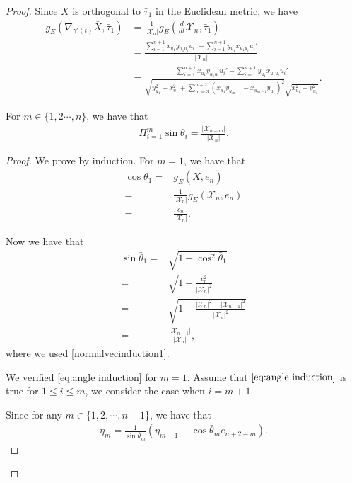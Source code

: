 \documentclass[10pt,a4paper]{amsart}
\begin{document}
\begin{proof}
    Since $\bar{X}$ is orthogonal to $\bar{\tau}_1$ in the Euclidean metric, we have
    \begin{align*}
        g_E(\nabla_{\gamma'(t)}\bar{X},\bar{\tau}_1)&=\frac{1}{|\mathcal{X}_n|}g_E(\frac{d}{dt}\mathcal{X}_n,\bar{\tau}_1)\\
        &=\frac{\sum_{i=1}^{n+1}x_{u_1}y_{u_1u_i}u_i'-\sum_{i=1}^{n+1}y_{u_1}x_{u_1u_{i}}u_i'}{|\mathcal{X}_n|}\\
        &=\frac{\sum_{i=1}^{n+1}x_{u_1}y_{u_1u_i}u_i'-\sum_{i=1}^{n+1}y_{u_1}x_{u_1u_{i}}u_i'}{\sqrt{y_{u_1}^2+x_{u_1}^2+\sum_{m=3}^{n+2}(x_{u_1}y_{u_{m-1}}-x_{u_{m-1}}y_{u_1})^2}\sqrt{x^2_{u_1}+y^2_{u_1}}}.
    \end{align*}

\begin{lem}
    For $m\in\{1,2\cdots, n\}$, we have that
    \begin{align}\label{eq:angle induction}
        \Pi_{i=1}^m\sin\bar{\theta}_i=\frac{|\mathcal{X}_{n-m}|}{|\mathcal{X}_{n}|}.
    \end{align}
\end{lem}
\begin{proof}

We prove by induction. For $m=1$, we have that
\begin{align*}
    \cos\bar{\theta}_1=&g_E(\bar{X},e_n)\\
                      =&\frac{1}{|\mathcal{X}_n|}g_E(\mathcal{X}_n,e_n)\\
                      =&\frac{c_n}{|\mathcal{X}_n|}.
\end{align*}

Now we have that
\begin{align*}
    \sin\bar{\theta}_1=&\sqrt{1-\cos^2\bar{\theta}_1}\\
                      =&\sqrt{1-\frac{c_n^2}{|\mathcal{X}_n|^2}}\\
                      =&\sqrt{1-\frac{|\mathcal{X}_n|^2-|\mathcal{X}_{n-1}|^2}{|\mathcal{X}_n|^2}}\\
                      =&\frac{|\mathcal{X}_{n-1}|}{|\mathcal{X}_n|},
\end{align*}
where we used \eqref{normalvecinduction1}.

We verified \eqref{eq:angle induction} for $m=1$. Assume that $\eqref{eq:angle induction}$ is true for $1\leq i\leq m$, we consider the case when $i=m+1$.

Since for any $m\in\{1,2,\cdots, n-1\}$, we have that
\begin{align*}
    \bar{\eta}_{m}=\frac{1}{\sin\bar{\theta}_m}\left(\bar{\eta}_{m-1}-\cos\bar{\theta}_{m}e_{n+2-m}\right).
\end{align*}


\end{proof}
\end{proof}
\end{document}
